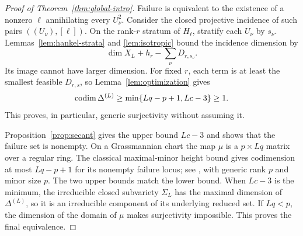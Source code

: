 \begin{proof}[Proof of Theorem~\ref{thm:global-intro}]
Failure is equivalent to the existence of a nonzero $\ell$ annihilating every $U_\nu^2$. Consider the closed projective incidence of such pairs $((U_\nu),[\ell])$. On the rank-$r$ stratum of $H_\ell$, stratify each $U_\nu$ by $s_\nu$. Lemmas~\ref{lem:hankel-strata} and \ref{lem:isotropic} bound the incidence dimension by
\[
 \dim X_L+h_r-\sum_\nu D_{r,s_\nu}.
\]
Its image cannot have larger dimension. For fixed $r$, each term is at least the smallest feasible $D_{r,s}$, so Lemma~\ref{lem:optimization} gives
\[
 \operatorname{codim}\Delta^{(L)}\ge\min\{Lq-p+1,Lc-3\}\ge1.
\]
This proves, in particular, generic surjectivity without assuming it.

Proposition~\ref{prop:secant} gives the upper bound $Lc-3$ and shows that the failure set is nonempty. On a Grassmannian chart the map $\mu$ is a $p\times Lq$ matrix over a regular ring. The classical maximal-minor height bound gives codimension at most $Lq-p+1$ for its nonempty failure locus; see \cite[Introduction]{EHU}, with generic rank $p$ and minor size $p$. The two upper bounds match the lower bound. When $Lc-3$ is the minimum, the irreducible closed subvariety $\Sigma_L$ has the maximal dimension of $\Delta^{(L)}$, so it is an irreducible component of its underlying reduced set. If $Lq<p$, the dimension of the domain of $\mu$ makes surjectivity impossible. This proves the final equivalence.
\end{proof}

